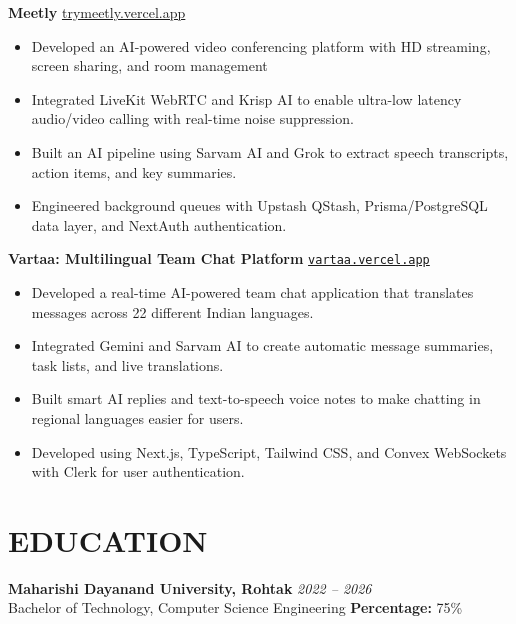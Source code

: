\documentclass[a4paper,11pt]{article}
\begin{document}
\vspace{3pt}

 \textbf{Meetly} \hfill
\href{https://trymeetly.vercel.app}{trymeetly.vercel.app}
\begin{itemize}
  \item Developed an AI-powered video conferencing platform with HD streaming, screen sharing, and room management
  \item Integrated LiveKit WebRTC and Krisp AI to enable ultra-low latency audio/video calling with real-time noise suppression.
  \item Built an AI pipeline using Sarvam AI and Grok to extract speech transcripts, action items, and key summaries.
  \item Engineered background queues with Upstash QStash, Prisma/PostgreSQL data layer, and NextAuth authentication.
\end{itemize}

\vspace{3pt}

\textbf{Vartaa: Multilingual Team Chat Platform} \hfill \href{https://vartaa.vercel.app}{\texttt{vartaa.vercel.app}}
\begin{itemize}
    \item Developed a real-time AI-powered team chat application that translates messages across 22 different Indian languages.
    \item Integrated Gemini and Sarvam AI to create automatic message summaries, task lists, and live translations.
    \item Built smart AI replies and text-to-speech voice notes to make chatting in regional languages easier for users.
    \item Developed using Next.js, TypeScript, Tailwind CSS, and Convex WebSockets with Clerk for user authentication.
\end{itemize}

\vspace{3pt}



\vspace{3pt}


\section*{EDUCATION}

\textbf{Maharishi Dayanand University, Rohtak} \hfill \textit{2022 -- 2026}\\
Bachelor of Technology, Computer Science Engineering \hfill \textbf{Percentage:} 75\%
\end{document}
